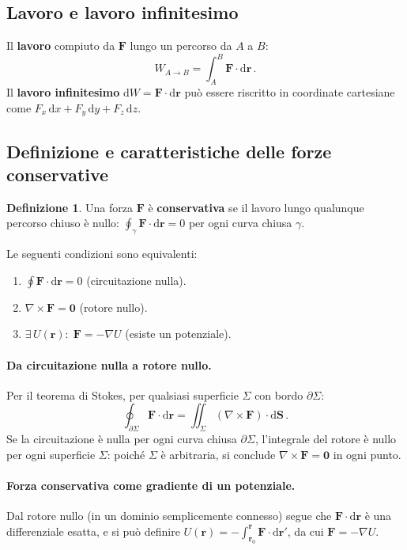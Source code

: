 \documentclass[11pt,a4paper]{article}
\renewcommand{\vec}[1]{\bm{#1}}
\theoremstyle{plain}
\theoremstyle{definition}
\newtheorem{definizione}{Definizione}[section]
\theoremstyle{remark}
\begin{document}
\subsection{Lavoro e lavoro infinitesimo}

Il \textbf{lavoro} compiuto da $\vec{F}$ lungo un percorso da $A$ a $B$:
\[
  W_{A\to B}=\int_A^B\vec{F}\cdot\mathrm{d}\vec{r}\,.
\]
Il \textbf{lavoro infinitesimo} $\mathrm{d}W=\vec{F}\cdot\mathrm{d}\vec{r}$
può essere riscritto in coordinate cartesiane come
$F_x\,\mathrm{d}x+F_y\,\mathrm{d}y+F_z\,\mathrm{d}z$.

\subsection{Definizione e caratteristiche delle forze conservative}

\begin{definizione}
Una forza $\vec{F}$ è \textbf{conservativa} se il lavoro lungo qualunque
percorso chiuso è nullo:
$\oint_\gamma\vec{F}\cdot\mathrm{d}\vec{r}=0$ per ogni curva chiusa $\gamma$.
\end{definizione}
Le seguenti condizioni sono equivalenti:
\begin{enumerate}[label=(\roman*)]
  \item $\oint\vec{F}\cdot\mathrm{d}\vec{r}=0$ (circuitazione nulla).
  \item $\nabla\times\vec{F}=\vec{0}$ (rotore nullo).
  \item $\exists\, U(\vec{r}):\;\vec{F}=-\nabla U$ (esiste un potenziale).
\end{enumerate}

\paragraph{Da circuitazione nulla a rotore nullo.}
Per il teorema di Stokes, per qualsiasi superficie $\Sigma$ con bordo $\partial\Sigma$:
\[
  \oint_{\partial\Sigma}\vec{F}\cdot\mathrm{d}\vec{r}
  =\iint_\Sigma(\nabla\times\vec{F})\cdot\mathrm{d}\vec{S}\,.
\]
Se la circuitazione è nulla per ogni curva chiusa $\partial\Sigma$, l'integrale
del rotore è nullo per ogni superficie $\Sigma$: poiché $\Sigma$ è arbitraria,
si conclude $\nabla\times\vec{F}=\vec{0}$ in ogni punto.

\paragraph{Forza conservativa come gradiente di un potenziale.}
Dal rotore nullo (in un dominio semplicemente connesso) segue che
$\vec{F}\cdot\mathrm{d}\vec{r}$ è una differenziale esatta, e si può definire
$U(\vec{r})=-\int_{\vec{r}_0}^{\vec{r}}\vec{F}\cdot\mathrm{d}\vec{r}'$,
da cui $\vec{F}=-\nabla U$.
\end{document}
